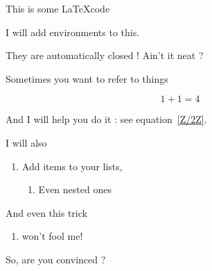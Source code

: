 \documentclass{article}
\begin{document}
    This is some \LaTeX code

    I will add environments to this.

    \begin{em}
        They are automatically closed ! Ain't it neat ?
    \end{em}

    Sometimes you want to refer to things

    \begin{equation}\label{Z/2Z}
        1 + 1 = 4
    \end{equation}

    And I will help you do it : see equation~\ref{Z/2Z}.

    I will also
    \begin{enumerate}
        \item Add items to your lists,
        \begin{enumerate}
            \item Even nested ones
        \end{enumerate}
    \end{enumerate}

    And even this trick
    \begin{enumerate}
        \item won't fool me!
    \end{enumerate}


    So, are you convinced ?
\end{document}
